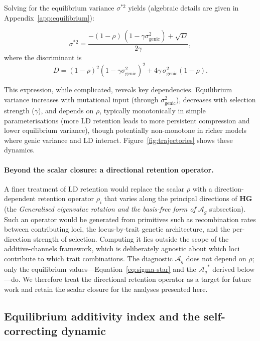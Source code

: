 \documentclass[9pt,twocolumn,twoside,lineno]{gsajnl}
\newcommand{\mat}[1]{\mathbf{#1}}
\newcommand{\Ag}{\ensuremath{\mathcal{A}_{g}}\xspace}
\begin{document}
Solving for the equilibrium variance $\sigma^{*2}$ yields (algebraic details are given in Appendix~\ref{app:equilibrium}):

\begin{equation}
\sigma^{*2}
= \frac{-(1-\rho)\,(1-\gamma\sigma^2_{\text{genic}}) + \sqrt{D}}{2\gamma},
\label{eq:sigma-star}
\end{equation}
where the discriminant is
\begin{equation}
D = (1-\rho)^2(1-\gamma\sigma^2_{\text{genic}})^2 + 4\gamma\,\sigma^2_{\text{genic}}(1-\rho).
\label{eq:sigma-star-discriminant}
\end{equation}

This expression, while complicated, reveals key dependencies. Equilibrium variance increases with mutational input (through $\sigma^2_{\text{genic}}$), decreases with selection strength ($\gamma$), and depends on $\rho$, typically monotonically in simple parameterisations (more LD retention leads to more persistent compression and lower equilibrium variance), though potentially non-monotone in richer models where genic variance and LD interact. Figure~\ref{fig:trajectories} shows these dynamics.

\paragraph{Beyond the scalar closure: a directional retention operator.}
A finer treatment of LD retention would replace the scalar $\rho$ with a direction-dependent retention operator $\rho_i$ that varies along the principal directions of $\mat{H}\mat{G}$ (the \textit{Generalised eigenvalue rotation and the basis-free form of \Ag} subsection). Such an operator would be generated from primitives such as recombination rates between contributing loci, the locus-by-trait genetic architecture, and the per-direction strength of selection. Computing it lies outside the scope of the additive-channels framework, which is deliberately agnostic about which loci contribute to which trait combinations. The diagnostic \Ag does not depend on $\rho$; only the equilibrium values---Equation~\eqref{eq:sigma-star} and the $\Ag^*$ derived below---do. We therefore treat the directional retention operator as a target for future work and retain the scalar closure for the analyses presented here.

\subsection{Equilibrium additivity index and the self-correcting dynamic}
\end{document}
